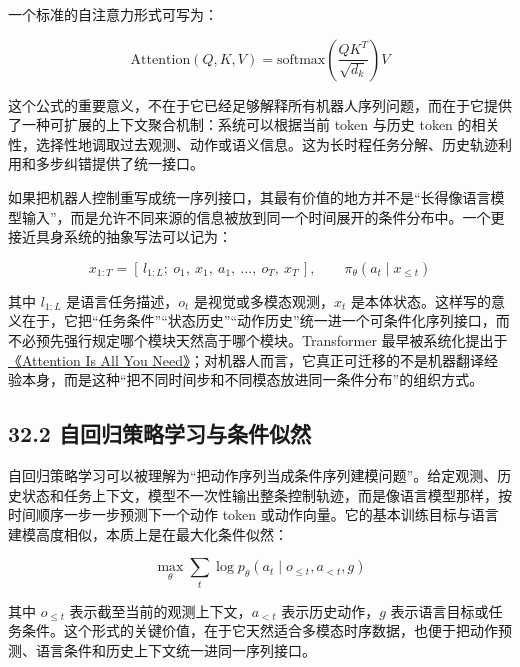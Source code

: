 一个标准的自注意力形式可写为：

\begingroup
\footnotesize
\begin{equation*}
\mathrm{Attention}(Q,K,V)=\mathrm{softmax}\left(\frac{QK^T}{\sqrt{d_k}}\right)V
\end{equation*}
\endgroup

这个公式的重要意义，不在于它已经足够解释所有机器人序列问题，而在于它提供了一种可扩展的上下文聚合机制：系统可以根据当前 token 与历史 token 的相关性，选择性地调取过去观测、动作或语义信息。这为长时程任务分解、历史轨迹利用和多步纠错提供了统一接口。

如果把机器人控制重写成统一序列接口，其最有价值的地方并不是“长得像语言模型输入”，而是允许不同来源的信息被放到同一个时间展开的条件分布中。一个更接近具身系统的抽象写法可以记为：

\begingroup
\scriptsize
\begin{equation*}
x_{1:T} = [\,l_{1:L};\ o_1,\ x_1,\ a_1,\ \dots,\ o_T,\ x_T\,], \qquad
\pi_\theta(a_t \mid x_{\le t})
\end{equation*}
\endgroup

其中 \(l_{1:L}\) 是语言任务描述，\(o_t\) 是视觉或多模态观测，\(x_t\) 是本体状态。这样写的意义在于，它把“任务条件”“状态历史”“动作历史”统一进一个可条件化序列接口，而不必预先强行规定哪个模块天然高于哪个模块。Transformer 最早被系统化提出于 \href{https://arxiv.org/abs/1706.03762}{《Attention Is All You Need》}；对机器人而言，它真正可迁移的不是机器翻译经验本身，而是这种“把不同时间步和不同模态放进同一条件分布”的组织方式。

\subsection*{32.2 自回归策略学习与条件似然}


自回归策略学习可以被理解为“把动作序列当成条件序列建模问题”。给定观测、历史状态和任务上下文，模型不一次性输出整条控制轨迹，而是像语言模型那样，按时间顺序一步一步预测下一个动作 token 或动作向量。它的基本训练目标与语言建模高度相似，本质上是在最大化条件似然：

\begingroup
\footnotesize
\begin{equation*}
\max_\theta \sum_t \log p_\theta(a_t \mid o_{\le t}, a_{<t}, g)
\end{equation*}
\endgroup

其中 \(o_{\le t}\) 表示截至当前的观测上下文，\(a_{<t}\) 表示历史动作，\(g\) 表示语言目标或任务条件。这个形式的关键价值，在于它天然适合多模态时序数据，也便于把动作预测、语言条件和历史上下文统一进同一序列接口。

